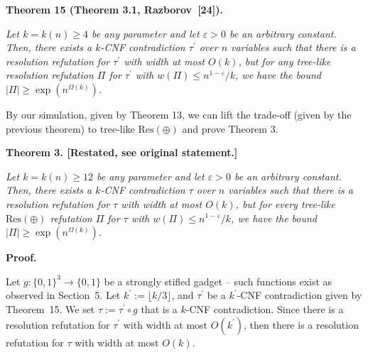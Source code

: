 \par\medskip\noindent\textbf{
\textbf{Theorem 15}\textbf{ }(Theorem 3.1, Razborov [24])\textbf{.}
}\par



\emph{Let $k=k(n)\geq 4$ be any parameter and let $\varepsilon>0$ be an arbitrary constant.
Then, there exists a $k$-CNF contradiction $\tau^{\prime}$ over $n$ variables such that there is a resolution refutation for $\tau^{\prime}$ with width at most $O(k)$, but for any tree-like resolution refutation $\Pi$ for $\tau^{\prime}$ with $w(\Pi)\leq n^{1-\varepsilon}/k$, we have the bound $|\Pi|\geq\exp(n^{\Omega(k)})$.}\par






By our simulation, given by Theorem 13, we can lift the trade-off (given by the previous theorem) to tree-like $\text{Res}(\oplus)$ and prove Theorem 3.\par






\par\medskip\noindent\textbf{
\textbf{Theorem 3}\textbf{.}
[Restated, see original statement.]}\par



\emph{Let $k=k(n)\geq 12$ be any parameter and let $\varepsilon>0$ be an arbitrary constant.
Then, there exists a $k$-CNF contradiction $\tau$ over $n$ variables such that there is a resolution refutation for $\tau$ with width at most $O(k)$, but for every tree-like $\text{Res}(\oplus)$ refutation $\Pi$ for $\tau$ with $w(\Pi)\leq n^{1-\varepsilon}/k$, we have the bound $|\Pi|\geq\exp(n^{\Omega(k)})$.}\par







\par\medskip\noindent\textbf{Proof.}\par




Let $g:\{0,1\}^{3}\to\{0,1\}$ be a strongly stifled gadget – such functions exist as observed in Section 5.
Let $k^{\prime}:=\lfloor k/3\rfloor$, and $\tau^{\prime}$ be a $k^{\prime}$-CNF contradiction given by Theorem 15.
We set $\tau:=\tau^{\prime}\circ g$ that is a $k$-CNF contradiction.
Since there is a resolution refutation for $\tau^{\prime}$ with width at most $O(k^{\prime})$, then there is a resolution refutation for $\tau$ with width at most $O(k)$.\par




